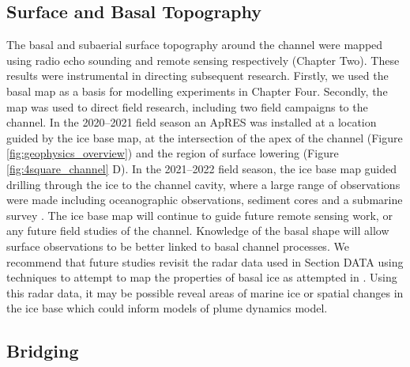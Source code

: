 \subsection{Surface and Basal Topography}

The basal and subaerial surface topography around the channel were mapped using radio echo sounding and remote sensing respectively (Chapter Two).  
These results were instrumental in directing subsequent research. Firstly, we used the basal map as a basis for modelling experiments in Chapter Four. Secondly, the map was used to direct field research, including two field campaigns to the channel. In the 2020--2021 field season an ApRES was installed at a location guided by the ice base map, at the intersection of the apex of the channel (Figure \ref{fig:geophysics_overview}) and the region of surface lowering (Figure \ref{fig:4square_channel} D). In the 2021--2022 field season, the ice base map guided drilling through the ice to the channel cavity, where a large range of observations were made including oceanographic observations, sediment cores and a submarine survey \citep{horgan2022channel}. The ice base map will continue to guide future remote sensing work, or any future field studies of the channel. Knowledge of the basal shape will allow surface observations to be better linked to basal channel processes. 
We recommend that future studies revisit the radar data used in Section DATA using techniques to attempt to map the properties of basal ice as attempted in \cite{macgregor2011grounding}. Using this radar data, it may be possible reveal areas of marine ice or spatial changes in the ice base which could inform models of plume dynamics model.

\subsection{Bridging}

